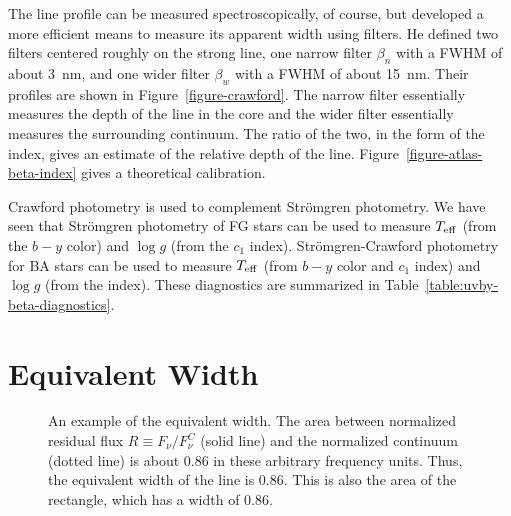 The line profile can be measured spectroscopically, of course, but \cite{Crawford-1958} developed a more efficient means to measure its apparent width using filters. He defined two filters centered roughly on the strong {\Hbeta} line, one narrow filter $\beta_n$ with a FWHM of about 3~nm, and one wider filter $\beta_w$ with a FWHM of about 15~nm. Their profiles are shown in Figure~\ref{figure-crawford}. The narrow filter essentially measures the depth of the line in the core and the wider filter essentially measures the surrounding continuum. The ratio of the two, in the form of the {\Hbeta} index, gives an estimate of the relative depth of the line. Figure~\ref{figure-atlas-beta-index} gives a theoretical calibration.

Crawford photometry is used to complement Strömgren photometry.  We have seen that Strömgren photometry of FG stars can be used to measure $T_\mathrm{eff}$ (from the $b-y$ color) and $\log g$ (from the $c_1$ index). Strömgren-Crawford photometry for BA stars can be used to measure $T_\mathrm{eff}$ (from $b-y$ color and $c_1$ index) and $\log g$ (from the {\Hbeta} index). These diagnostics are summarized in Table~\ref{table:uvby-beta-diagnostics}.

\newslide

\section{Equivalent Width}

\begin{figure}
\footnotesize
{}
\caption{An example of the equivalent width. The area between normalized residual flux $R \equiv F_\nu/F_\nu^C$ (solid line) and the normalized continuum (dotted line) is about 0.86 in these arbitrary frequency units. Thus, the equivalent width of the line is 0.86. This is also the area of the rectangle, which has a width of 0.86.}
\label{figure:equivalent-width}
\end{figure}

